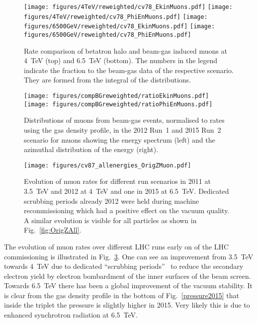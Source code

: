 \begin{figure}
\begin{center}
  \texttt{[image: figures/4TeV/reweighted/cv78\_EkinMuons.pdf]}
  \texttt{[image: figures/4TeV/reweighted/cv78\_PhiEnMuons.pdf]}
  \texttt{[image: figures/6500GeV/reweighted/cv78\_EkinMuons.pdf]}
  \texttt{[image: figures/6500GeV/reweighted/cv78\_PhiEnMuons.pdf]}
\end{center}
\vspace{-0.6cm}
 \caption{Rate comparison of betatron halo and beam-gas induced muons at 4~TeV (top) and 6.5~TeV (bottom). The numbers in the legend indicate the fraction to the beam-gas data of the respective scenario. They are formed from the integral of the distributions.
  \label{compAllBKG_run12}}
\end{figure}

\begin{figure}%
\centering

\texttt{[image: figures/compBGreweighted/ratioEkinMuons.pdf]}
\texttt{[image: figures/compBGreweighted/ratioPhiEnMuons.pdf]}
\caption{Distributions of muons from beam-gas events, normalised to rates using the gas density profile, in the 2012 Run~1 and 2015 Run~2 scenario for muons showing the energy spectrum (left) and the azimuthal distribution of the energy (right).
  \label{fig:compBGreweighted1}}
\end{figure}


\begin{figure}
\begin{center}
  \texttt{[image: figures/cv87\_allenergies\_OrigZMuon.pdf]}
\end{center}
\vspace{-0.6cm}
 \caption{Evolution of muon rates for different run scenarios in 2011 at 3.5~TeV and 2012 at 4~TeV and one in 2015 at 6.5~TeV. Dedicated scrubbing periods already 2012 were held during machine recommissioning which had a positive effect on the vacuum quality. A similar evolution is visible for all particles as shown in Fig.~\ref{fig:OrigZAll}.
  \label{fig:OrigZMuon}} 
\end{figure}


The evolution of muon rates over different LHC runs early on of the LHC commissioning is illustrated in Fig.~\ref{fig:OrigZMuon}. One can see an improvement from 3.5~TeV towards 4~TeV due to dedicated ``scrubbing periods''~\cite{iadarolaEvian2012} to reduce the secondary electron yield by electron bombardment of the inner surfaces of the beam screen. Towards 6.5~TeV there has been a global improvement of the vacuum stability. It is clear from the gas density profile in the bottom of Fig.~\ref{pressure2015} that inside the triplet the pressure is slightly higher in 2015. Very likely this is due to enhanced synchrotron radiation at 6.5~TeV. 

